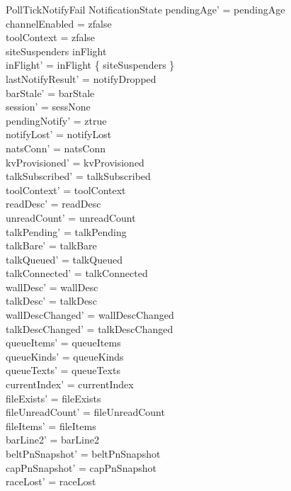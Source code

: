 \documentclass[a4paper,10pt,fleqn]{article}
\begin{document}
\begin{schema}{PollTickNotifyFail}
  \Delta NotificationState
  \where
  pendingAge' = pendingAge \\
  channelEnabled = zfalse \\
  toolContext = zfalse \\
  siteSuspenders \in inFlight \\
  inFlight' = inFlight \setminus \{ siteSuspenders \} \\
  lastNotifyResult' = notifyDropped \\
  barStale' = barStale \\
  session' = sessNone \\
  pendingNotify' = ztrue \\
  notifyLost' = notifyLost \\
  natsConn' = natsConn \\
  kvProvisioned' = kvProvisioned \\
  talkSubscribed' = talkSubscribed \\
  toolContext' = toolContext \\
  readDesc' = readDesc \\
  unreadCount' = unreadCount \\
  talkPending' = talkPending \\
  talkBare' = talkBare \\
  talkQueued' = talkQueued \\
  talkConnected' = talkConnected \\
  wallDesc' = wallDesc \\
  talkDesc' = talkDesc \\
  wallDescChanged' = wallDescChanged \\
  talkDescChanged' = talkDescChanged \\
  queueItems' = queueItems \\
  queueKinds' = queueKinds \\
  queueTexts' = queueTexts \\
  currentIndex' = currentIndex \\
  fileExists' = fileExists \\
  fileUnreadCount' = fileUnreadCount \\
  fileItems' = fileItems \\
  barLine2' = barLine2 \\
  beltPnSnapshot' = beltPnSnapshot \\
  capPnSnapshot' = capPnSnapshot \\
  raceLost' = raceLost \\

\end{schema}
\end{document}
